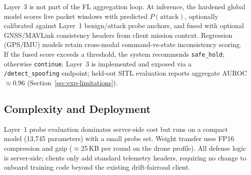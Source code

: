 Layer~3 is not part of the FL aggregation loop.
At inference, the hardened global model scores live packet windows with predicted $P(\text{attack})$, optionally calibrated against Layer~1 benign/attack probe anchors, and fused with optional GNSS/MAVLink consistency headers from client mission context.
Regression (GPS/IMU) models retain cross-modal command-vs-state inconsistency scoring.
If the fused score exceeds a threshold, the system recommends \texttt{safe\_hold}; otherwise \texttt{continue}.
Layer~3 is implemented and exposed via a \texttt{/detect\_spoofing} endpoint; held-out SITL evaluation reports aggregate AUROC $\approx 0.96$ (Section~\ref{sec:exp-limitations}).

\subsection{Complexity and Deployment}
\label{sec:method-complexity}

Layer~1 probe evaluation dominates server-side cost but runs on a compact model (13{,}745 parameters) with a small probe set.
Weight transfer uses FP16 compression and gzip ($\approx$25\,KB per round on the drone profile).
All defense logic is server-side; clients only add standard telemetry headers, requiring no change to onboard training code beyond the existing drift-fairroad client.
